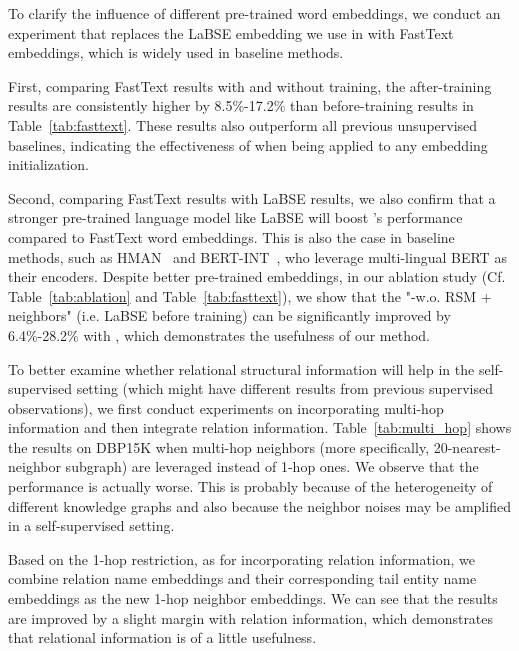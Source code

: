 To clarify the influence of different pre-trained word embeddings, we conduct an experiment that replaces the LaBSE embedding we use in \solution with FastText embeddings, which is widely used in baseline methods.

First, comparing FastText results with and without training, the after-training results are consistently higher by 8.5\%-17.2\% than before-training results in Table~\ref{tab:fasttext}. These results also outperform all previous unsupervised baselines, indicating the effectiveness of \solution when being applied to any embedding initialization.

Second, comparing FastText results with LaBSE results, we also confirm that a stronger pre-trained language model like LaBSE will boost \solution's performance compared to FastText word embeddings. This is also the case in baseline methods, such as HMAN~\cite{yang2019aligning} and BERT-INT~\cite{tang2019bert-int}, who leverage multi-lingual BERT as their encoders. Despite better pre-trained embeddings, in our ablation study (Cf. Table~\ref{tab:ablation} and Table~\ref{tab:fasttext}), we show that the "-w.o. RSM + neighbors" (i.e. LaBSE before \solution training) can be significantly improved by 6.4\%-28.2\% with \solution, which demonstrates the usefulness of our method.

To better examine whether relational structural information will help in the self-supervised setting (which might have different results from previous supervised observations), we first conduct experiments on incorporating multi-hop information and then integrate relation information. Table~\ref{tab:multi_hop} shows the results on DBP15K when multi-hop neighbors (more specifically, 20-nearest-neighbor subgraph) are leveraged instead of 1-hop ones. We observe that the performance is actually worse. This is probably because of the heterogeneity of different knowledge graphs and also because the neighbor noises may be amplified in a self-supervised setting. 



Based on the 1-hop restriction, as for incorporating relation information, we combine relation name embeddings and their corresponding tail entity name embeddings as the new 1-hop neighbor embeddings. We can see that the results are improved by a slight margin with relation information, which demonstrates that relational information is of a little usefulness.


